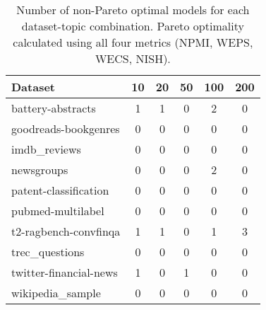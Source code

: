 \begin{table}
\caption{Number of non-Pareto optimal models for each dataset-topic combination. Pareto optimality calculated using all four metrics (NPMI, WEPS, WECS, NISH).}
\label{tab:pareto_counts}
\begin{tabular}{lccccc}
\toprule
Dataset & 10 & 20 & 50 & 100 & 200 \\
\midrule
battery-abstracts & 1 & 1 & 0 & 2 & 0 \\
goodreads-bookgenres & 0 & 0 & 0 & 0 & 0 \\
imdb_reviews & 0 & 0 & 0 & 0 & 0 \\
newsgroups & 0 & 0 & 0 & 2 & 0 \\
patent-classification & 0 & 0 & 0 & 0 & 0 \\
pubmed-multilabel & 0 & 0 & 0 & 0 & 0 \\
t2-ragbench-convfinqa & 1 & 1 & 0 & 1 & 3 \\
trec_questions & 0 & 0 & 0 & 0 & 0 \\
twitter-financial-news & 1 & 0 & 1 & 0 & 0 \\
wikipedia_sample & 0 & 0 & 0 & 0 & 0 \\
\bottomrule
\end{tabular}
\end{table}
